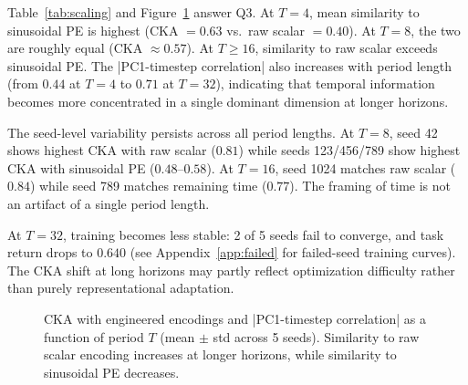 \documentclass{article}
\begin{document}
Table~\ref{tab:scaling} and Figure~\ref{fig:scaling} answer Q3.
At $T = 4$, mean similarity to sinusoidal PE is highest (CKA $= 0.63$ vs.\ raw scalar $= 0.40$).
At $T = 8$, the two are roughly equal (CKA $\approx 0.57$).
At $T \geq 16$, similarity to raw scalar exceeds sinusoidal PE.
The |PC1-timestep correlation| also increases with period length (from $0.44$ at $T = 4$ to $0.71$ at $T = 32$), indicating that temporal information becomes more concentrated in a single dominant dimension at longer horizons.

The seed-level variability persists across all period lengths.
At $T = 8$, seed 42 shows highest CKA with raw scalar ($0.81$) while seeds 123/456/789 show highest CKA with sinusoidal PE ($0.48$--$0.58$).
At $T = 16$, seed 1024 matches raw scalar ($0.84$) while seed 789 matches remaining time ($0.77$).
The framing of time is not an artifact of a single period length.

At $T = 32$, training becomes less stable: 2 of 5 seeds fail to converge, and task return drops to $0.640$ (see Appendix~\ref{app:failed} for failed-seed training curves).
The CKA shift at long horizons may partly reflect optimization difficulty rather than purely representational adaptation.

\begin{figure}[t]
\centering
{}
\caption{CKA with engineered encodings and |PC1-timestep correlation| as a function of period $T$ (mean $\pm$ std across 5 seeds). Similarity to raw scalar encoding increases at longer horizons, while similarity to sinusoidal PE decreases.}
\label{fig:scaling}
\end{figure}
\end{document}
